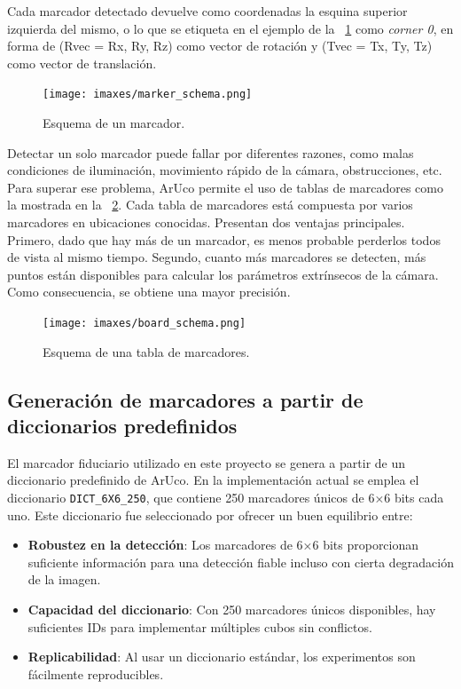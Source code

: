 Cada marcador detectado devuelve como coordenadas la esquina superior izquierda del mismo, o lo que se etiqueta en el ejemplo de la \figurename~\ref{fig:marker_schema} como \emph{corner 0}, en forma de (Rvec = {Rx, Ry, Rz}) como vector de rotación y (Tvec = {Tx, Ty, Tz}) como vector de translación.

\begin{figure}
	\centering
	\texttt{[image: imaxes/marker\_schema.png]}
	\caption{Esquema de un marcador.}
	\label{fig:marker_schema}
\end{figure}

Detectar un solo marcador puede fallar por diferentes razones, como malas condiciones de iluminación, movimiento rápido de la cámara, obstrucciones, etc. Para superar ese problema, ArUco permite el uso de tablas de marcadores como la mostrada en la \figurename~\ref{fig:board_schema}. Cada tabla de marcadores está compuesta por varios marcadores en ubicaciones conocidas. Presentan dos ventajas principales. Primero, dado que hay más de un marcador, es menos probable perderlos todos de vista al mismo tiempo. Segundo, cuanto más marcadores se detecten, más puntos están disponibles para calcular los parámetros extrínsecos de la cámara. Como consecuencia, se obtiene una mayor precisión.

\begin{figure}
	\centering
	\texttt{[image: imaxes/board\_schema.png]}
	\caption{Esquema de una tabla de marcadores.}
	\label{fig:board_schema}
\end{figure}

\subsection{Generación de marcadores a partir de diccionarios predefinidos}
El marcador fiduciario utilizado en este proyecto se genera a partir de un diccionario predefinido de ArUco. En la implementación actual se emplea el diccionario \texttt{DICT\_6X6\_250}, que contiene 250 marcadores únicos de 6×6 bits cada uno. Este diccionario fue seleccionado por ofrecer un buen equilibrio entre:

\begin{itemize}
    \item \textbf{Robustez en la detección}: Los marcadores de 6×6 bits proporcionan suficiente información para una detección fiable incluso con cierta degradación de la imagen.
    \item \textbf{Capacidad del diccionario}: Con 250 marcadores únicos disponibles, hay suficientes IDs para implementar múltiples cubos sin conflictos.
    \item \textbf{Replicabilidad}: Al usar un diccionario estándar, los experimentos son fácilmente reproducibles.
\end{itemize}

